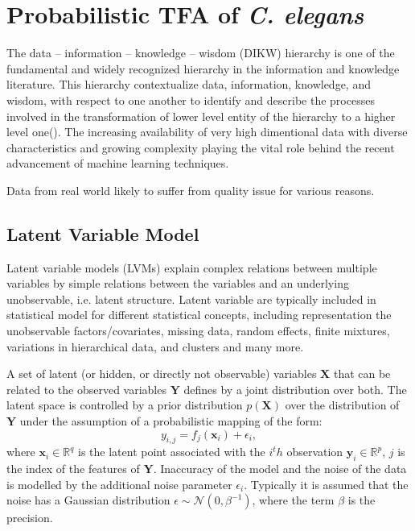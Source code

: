 \chapter{Probabilistic TFA of \textit{C. elegans}}

\ifpdf
    \graphicspath{{Chapter2/Figs/Raster/}{Chapter2/Figs/PDF/}{Chapter2/Figs/}}
\else
    \graphicspath{{Chapter2/Figs/Vector/}{Chapter2/Figs/}}
\fi

The data – information – knowledge – wisdom (DIKW) hierarchy is one of the 
fundamental and widely recognized hierarchy in the information and knowledge literature.
This hierarchy contextualize data, information, knowledge, and wisdom, with respect to one 
another to identify and describe the processes involved in the transformation of lower level entity
of the hierarchy to a higher level one(\cite{Rowley:2007}). The increasing availability
of very high dimentional data with diverse characteristics and growing complexity playing
the vital role behind the recent advancement of machine learning techniques. 

Data from real world likely to suffer from quality issue for various reasons. 



\section{Latent Variable Model}
Latent variable models (LVMs) \cite{Bishop:1999} explain complex relations between multiple variables 
by simple relations between the variables and an underlying unobservable, i.e. latent structure.
Latent variable are typically included in statistical model for different statistical concepts, 
including representation the unobservable factors/covariates, missing data, random effects, finite 
mixtures, variations in hierarchical data, and clusters and many more.

A set of latent (or hidden, or directly not observable) variables $\textbf{X}$ that can be related 
to the observed variables $\textbf{Y}$ defines by a joint distribution over both. The latent space is 
controlled by a prior distribution $p\left(\textbf{X}\right)$ over the distribution of $\textbf{Y}$
under the assumption of a probabilistic mapping of the form:
\begin{equation} \label{eq:linear_model}
y_{i,j} = f_j\left(\textbf{x}_{i}\right) + \epsilon_{i},
\end{equation}
where $\textbf{x}_i \in \mathbb{R}^q$ is the latent point associated with the $i^th$ observation
$\textbf{y}_i \in \mathbb{R}^p$, $j$ is the index of the features of $\textbf{Y}$. Inaccuracy of
the model  and the noise of the data is modelled by the additional noise parameter $\epsilon_{i}$.
Typically it is assumed that the noise has a Gaussian distribution 
$\epsilon \sim \mathcal{N} \left(0,\beta^{-1}\right)$, where the term $\beta$ is the precision.


